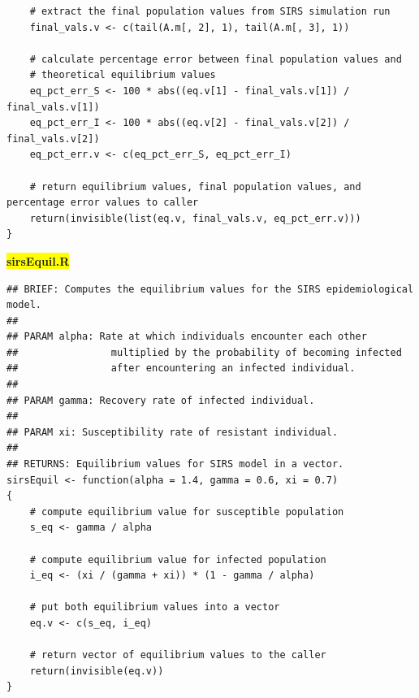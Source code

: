 \documentclass[11pt]{article}
\newcommand{\mybox}{%
    \collectbox{%
        \setlength{\fboxsep}{2pt}%
        \fbox{\BOXCONTENT}%
    }%
}
\begin{document}
\begin{lstlisting}
	# extract the final population values from SIRS simulation run	
	final_vals.v <- c(tail(A.m[, 2], 1), tail(A.m[, 3], 1)) 		
	
	# calculate percentage error between final population values and
	# theoretical equilibrium values	
	eq_pct_err_S <- 100 * abs((eq.v[1] - final_vals.v[1]) / final_vals.v[1])
	eq_pct_err_I <- 100 * abs((eq.v[2] - final_vals.v[2]) / final_vals.v[2])
	eq_pct_err.v <- c(eq_pct_err_S, eq_pct_err_I)
	
	# return equilibrium values, final population values, and percentage error values to caller	
	return(invisible(list(eq.v, final_vals.v, eq_pct_err.v)))
}
\end{lstlisting}

\vspace{10mm}

\noindent\mybox{\colorbox{yellow}{\textbf{sirsEquil.R}}}\hspace{3mm}\hrulefill
\begin{lstlisting}
## BRIEF: Computes the equilibrium values for the SIRS epidemiological model.
##
## PARAM alpha: Rate at which individuals encounter each other
##                multiplied by the probability of becoming infected
##                after encountering an infected individual. 
##
## PARAM gamma: Recovery rate of infected individual.
##
## PARAM xi: Susceptibility rate of resistant individual.
##
## RETURNS: Equilibrium values for SIRS model in a vector.
sirsEquil <- function(alpha = 1.4, gamma = 0.6, xi = 0.7)
{
	# compute equilibrium value for susceptible population
	s_eq <- gamma / alpha

	# compute equilibrium value for infected population
	i_eq <- (xi / (gamma + xi)) * (1 - gamma / alpha)
	
	# put both equilibrium values into a vector
	eq.v <- c(s_eq, i_eq)
	
	# return vector of equilibrium values to the caller
	return(invisible(eq.v))	
}
\end{lstlisting}

\vspace{10mm}
\end{document}
